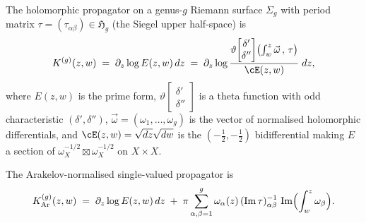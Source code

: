 \begin{proposition}
\label{prop:propagator-explicit}

The holomorphic propagator on a genus-$g$ Riemann surface
$\Sigma_g$ with period matrix $\tau = (\tau_{\alpha\beta})
\in \mathfrak{H}_g$ \textup{(}the Siegel upper half-space\textup{)}
is
\begin{equation}\label{eq:hol-propagator-theta}
 K^{(g)}(z,w)
 \;=\;
 \partial_z \log E(z,w)\, dz
 \;=\;
 \partial_z \log
 \frac{\vartheta\!\begin{bmatrix}\delta'\\\delta''\end{bmatrix}
 \!\bigl(\int_w^z \vec\omega\,,\,\tau\bigr)}
 {\cE(z,w)}\; dz,
\end{equation}
where $E(z,w)$ is the prime form,
$\vartheta\!\left[\begin{smallmatrix}\delta'\\\delta''\end{smallmatrix}\right]$
is a theta function with odd characteristic
$(\delta',\delta'')$, $\vec\omega = (\omega_1,\ldots,\omega_g)$
is the vector of normalised holomorphic differentials, and
$\cE(z,w) = \sqrt{dz}\sqrt{dw}$ is the $(-\frac{1}{2}, -\frac{1}{2})$
bidifferential making $E$ a section of
$\omega_X^{-1/2} \boxtimes \omega_X^{-1/2}$ on $X \times X$.

The Arakelov-normalised single-valued propagator is
\begin{equation}\label{eq:arakelov-propagator}
 K^{(g)}_{\mathrm{Ar}}(z,w)
 \;=\;
 \partial_z \log E(z,w)\, dz
 \;+\;
 \pi \sum_{\alpha,\beta=1}^g
 \omega_\alpha(z)\,
 (\operatorname{Im}\tau)^{-1}_{\alpha\beta}\,
 \operatorname{Im}\Bigl(\int_w^z \omega_\beta\Bigr).
\end{equation}
\end{proposition}
